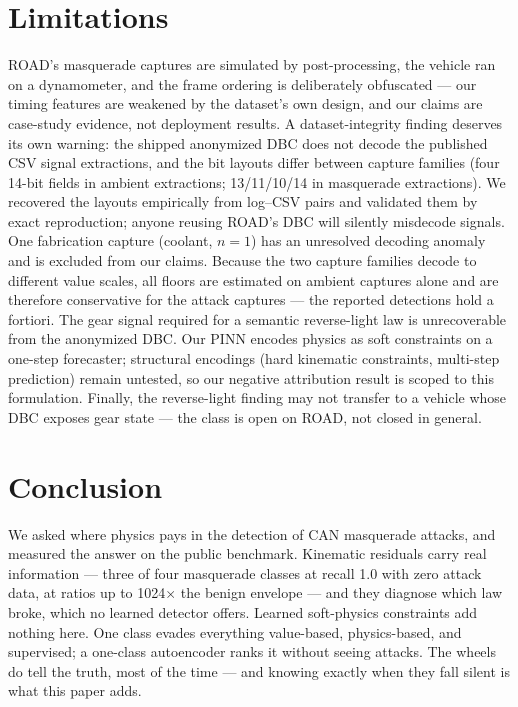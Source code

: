 \documentclass[10pt,twocolumn]{article}
\begin{document}
\section{Limitations}
ROAD's masquerade captures are simulated by post-processing, the vehicle ran on a dynamometer, and the frame ordering is deliberately obfuscated --- our timing features are weakened by the dataset's own design, and our claims are case-study evidence, not deployment results. A dataset-integrity finding deserves its own warning: the shipped anonymized DBC does not decode the published CSV signal extractions, and the bit layouts differ between capture families (four 14-bit fields in ambient extractions; 13/11/10/14 in masquerade extractions). We recovered the layouts empirically from log--CSV pairs and validated them by exact reproduction; anyone reusing ROAD's DBC will silently misdecode signals. One fabrication capture (coolant, $n{=}1$) has an unresolved decoding anomaly and is excluded from our claims. Because the two capture families decode to different value scales, all floors are estimated on ambient captures alone and are therefore conservative for the attack captures --- the reported detections hold a fortiori. The gear signal required for a semantic reverse-light law is unrecoverable from the anonymized DBC. Our PINN encodes physics as soft constraints on a one-step forecaster; structural encodings (hard kinematic constraints, multi-step prediction) remain untested, so our negative attribution result is scoped to this formulation. Finally, the reverse-light finding may not transfer to a vehicle whose DBC exposes gear state --- the class is open on ROAD, not closed in general.

\section{Conclusion}
We asked where physics pays in the detection of CAN masquerade attacks, and measured the answer on the public benchmark. Kinematic residuals carry real information --- three of four masquerade classes at recall 1.0 with zero attack data, at ratios up to 1024$\times$ the benign envelope --- and they diagnose which law broke, which no learned detector offers. Learned soft-physics constraints add nothing here. One class evades everything value-based, physics-based, and supervised; a one-class autoencoder ranks it without seeing attacks. The wheels do tell the truth, most of the time --- and knowing exactly when they fall silent is what this paper adds.
\end{document}
